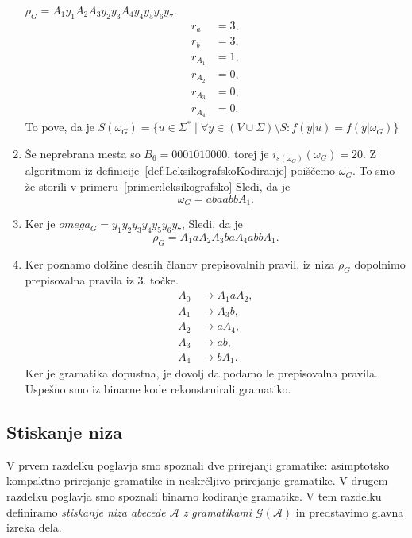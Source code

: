 \documentclass[fin1, tisk]{fmfdelo}
\newcommand{\A}{\mathcal{A}}
\newcommand{\G}{\mathcal{G}}
\theoremstyle{definition}
\begin{document}
\begin{primer}
\begin{enumerate}
        $\rho_G = A_1y_1A_2A_3y_2y_3A_4y_4y_5y_6y_7$.
        \begin{align*}
            r_a &= 3,\\
            r_b &= 3,\\
            r_{A_1} &= 1,\\
            r_{A_2} &= 0,\\
            r_{A_3} &= 0,\\
            r_{A_4} &= 0.
        \end{align*}
        To pove, da je $S(\omega_G) = \bigl\{ u \in \Sigma^* \mid \forall y \in (V \cup \Sigma) 
        \setminus S \colon f(y|u) = f(y|\omega_G) \bigr\}$
        \item Še neprebrana mesta so $B_6 = 0001010000$, torej je $i_{s(\omega_G)}(\omega_G) = 20$.
        Z algoritmom iz definicije~\ref{def:LeksikografskoKodiranje} poiščemo $\omega_G$. To smo 
        že storili v primeru~\ref{primer:leksikografsko} Sledi, da je
        \[
            \omega_G = abaabbA_1.
        \]
        \item Ker je $omega_G = y_1y_2y_3y_4y_5y_6y_7$, Sledi, da je
        \[
            \rho_G = A_1aA_2A_3baA_4abbA_1.
        \]
        \item Ker poznamo dolžine desnih članov prepisovalnih pravil, iz niza $\rho_G$ dopolnimo 
        prepisovalna pravila iz $3.$ točke. 
        \begin{align*}
            A_0 &\rightarrow A_1aA_2, \\
            A_1 &\rightarrow A_3b, \\
            A_2 &\rightarrow aA_4, \\
            A_3 &\rightarrow ab, \\
            A_4 &\rightarrow bA_1.
        \end{align*}
        Ker je gramatika dopustna, je dovolj da podamo le prepisovalna pravila. Uspešno smo
        iz binarne kode rekonstruirali gramatiko.
    \end{enumerate}
\end{primer}

\subsection{Stiskanje niza}\label{subsection:StiskanjeNiza}

V prvem razdelku poglavja smo spoznali dve prirejanji gramatike: asimptotsko kompaktno prirejanje 
gramatike in neskrčljivo prirejanje gramatike. V drugem razdelku poglavja smo spoznali binarno
kodiranje gramatike. V tem razdelku definiramo 
\emph{stiskanje niza abecede $\A$ z gramatikami $\G(\A)$} in predstavimo glavna izreka dela.
\end{document}
